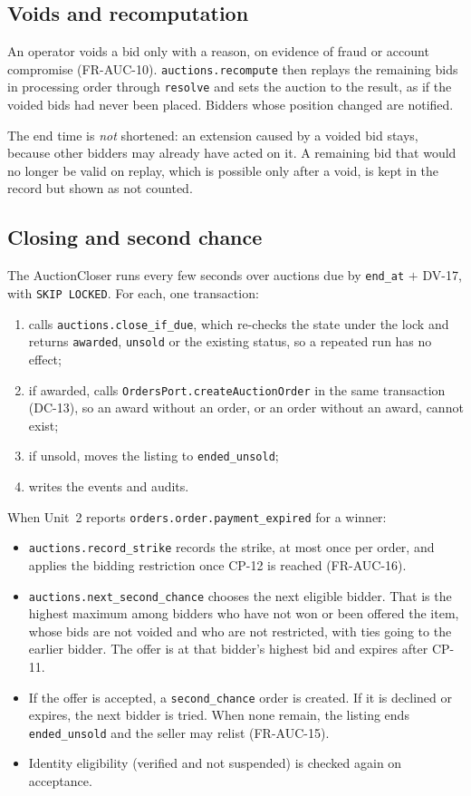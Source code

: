 \documentclass[11pt,a4paper]{article}
\begin{document}
\subsection{Voids and recomputation}
\label{sec:void}
An operator voids a bid only with a reason, on evidence of fraud or account compromise (FR-AUC-10). \texttt{auctions.recompute} then replays the remaining bids in processing order through \texttt{resolve} and sets the auction to the result, as if the voided bids had never been placed. Bidders whose position changed are notified.

The end time is \emph{not} shortened: an extension caused by a voided bid stays, because other bidders may already have acted on it. A remaining bid that would no longer be valid on replay, which is possible only after a void, is kept in the record but shown as not counted.

\subsection{Closing and second chance}
\label{sec:close}
\label{sec:second}
The AuctionCloser runs every few seconds over auctions due by \texttt{end\_at} $+$ DV-17, with \texttt{SKIP LOCKED}. For each, one transaction:
\begin{enumerate}[nosep]
  \item calls \texttt{auctions.close\_if\_due}, which re-checks the state under the lock and returns \texttt{awarded}, \texttt{unsold} or the existing status, so a repeated run has no effect;
  \item if awarded, calls \texttt{OrdersPort.createAuctionOrder} in the same transaction (DC-13), so an award without an order, or an order without an award, cannot exist;
  \item if unsold, moves the listing to \texttt{ended\_unsold};
  \item writes the events and audits.
\end{enumerate}

When Unit~2 reports \texttt{orders.order.payment\_expired} for a winner:
\begin{itemize}[nosep]
  \item \texttt{auctions.record\_strike} records the strike, at most once per order, and applies the bidding restriction once CP-12 is reached (FR-AUC-16).
  \item \texttt{auctions.next\_second\_chance} chooses the next eligible bidder. That is the highest maximum among bidders who have not won or been offered the item, whose bids are not voided and who are not restricted, with ties going to the earlier bidder. The offer is at that bidder's highest bid and expires after CP-11.
  \item If the offer is accepted, a \texttt{second\_chance} order is created. If it is declined or expires, the next bidder is tried. When none remain, the listing ends \texttt{ended\_unsold} and the seller may relist (FR-AUC-15).
  \item Identity eligibility (verified and not suspended) is checked again on acceptance.
\end{itemize}
\end{document}
